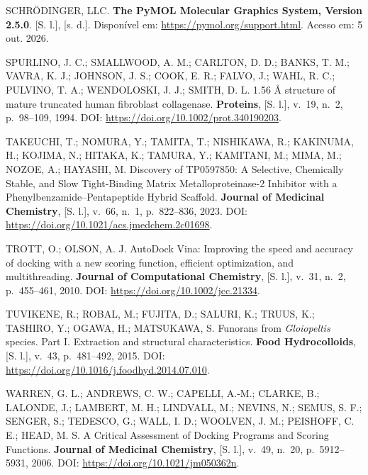 \begin{samepage}
\filbreak\hypertarget{cite.0@pymol}{}SCHRÖDINGER, LLC. \textbf{The PyMOL Molecular Graphics System, Version 2.5.0}. [S. l.], [s. d.]. Disponível em: \url{https://pymol.org/support.html}. Acesso em: 5 out. 2026.
\end{samepage}

\begin{samepage}
\filbreak\hypertarget{cite.0@spurlino1994}{}SPURLINO, J. C.; SMALLWOOD, A. M.; CARLTON, D. D.; BANKS, T. M.; VAVRA, K. J.; JOHNSON, J. S.; COOK, E. R.; FALVO, J.; WAHL, R. C.; PULVINO, T. A.; WENDOLOSKI, J. J.; SMITH, D. L. 1.56 Å structure of mature truncated human fibroblast collagenase. \textbf{Proteins}, [S. l.], v.~19, n.~2, p.~98--109, 1994. DOI: \url{https://doi.org/10.1002/prot.340190203}.
\end{samepage}

\begin{samepage}
\filbreak\hypertarget{cite.0@takeuchi2023}{}TAKEUCHI, T.; NOMURA, Y.; TAMITA, T.; NISHIKAWA, R.; KAKINUMA, H.; KOJIMA, N.; HITAKA, K.; TAMURA, Y.; KAMITANI, M.; MIMA, M.; NOZOE, A.; HAYASHI, M. Discovery of TP0597850: A Selective, Chemically Stable, and Slow Tight-Binding Matrix Metalloproteinase-2 Inhibitor with a Phenylbenzamide--Pentapeptide Hybrid Scaffold. \textbf{Journal of Medicinal Chemistry}, [S. l.], v.~66, n.~1, p.~822--836, 2023. DOI: \url{https://doi.org/10.1021/acs.jmedchem.2c01698}.
\end{samepage}

\begin{samepage}
\filbreak\hypertarget{cite.0@trott2010}{}TROTT, O.; OLSON, A. J. AutoDock Vina: Improving the speed and accuracy of docking with a new scoring function, efficient optimization, and multithreading. \textbf{Journal of Computational Chemistry}, [S. l.], v.~31, n.~2, p.~455--461, 2010. DOI: \url{https://doi.org/10.1002/jcc.21334}.
\end{samepage}

\begin{samepage}
\filbreak\hypertarget{cite.0@tuvikene2015funorans}{}TUVIKENE, R.; ROBAL, M.; FUJITA, D.; SALURI, K.; TRUUS, K.; TASHIRO, Y.; OGAWA, H.; MATSUKAWA, S. Funorans from \textit{Gloiopeltis} species. Part I. Extraction and structural characteristics. \textbf{Food Hydrocolloids}, [S. l.], v.~43, p.~481--492, 2015. DOI: \url{https://doi.org/10.1016/j.foodhyd.2014.07.010}.
\end{samepage}

\begin{samepage}
\filbreak\hypertarget{cite.0@warren2006}{}WARREN, G. L.; ANDREWS, C. W.; CAPELLI, A.-M.; CLARKE, B.; LALONDE, J.; LAMBERT, M. H.; LINDVALL, M.; NEVINS, N.; SEMUS, S. F.; SENGER, S.; TEDESCO, G.; WALL, I. D.; WOOLVEN, J. M.; PEISHOFF, C. E.; HEAD, M. S. A Critical Assessment of Docking Programs and Scoring Functions. \textbf{Journal of Medicinal Chemistry}, [S. l.], v.~49, n.~20, p.~5912--5931, 2006. DOI: \url{https://doi.org/10.1021/jm050362n}.
\end{samepage}
\endgroup
